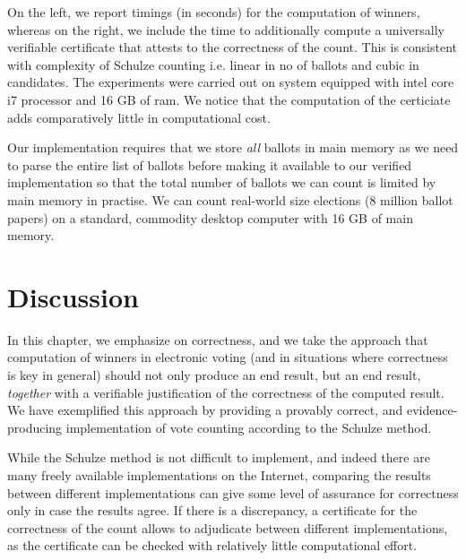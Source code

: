 
\noindent
On the left, we report timings (in seconds) for the computation of
winners, whereas on the right, we include the time to additionally
compute a universally verifiable certificate that attests  to the
correctness of the count. This is consistent with complexity of Schulze 
counting i.e. linear in no of ballots and cubic in candidates. 
The experiments were carried out on system 
equipped with intel core i7 processor and 16 GB of ram. We notice that the
computation of the certiciate adds comparatively little in
computational cost. 

Our implementation requires that we store \emph{all}
ballots in main memory as we need to parse the entire list of
ballots before making it available to our verified implementation so
that the total number of ballots we can count is limited by main
memory in practise. We can count real-world size elections (8
million ballot papers) on a standard, commodity desktop computer with
16 GB of main memory. 

  
\section{Discussion} \label{sec:discussion}

In this chapter,  we emphasize on correctness, 
and we take the approach that computation of winners in
electronic voting (and in situations where correctness is key in
general) should not only produce an end result, but an end result,
\emph{together} with a verifiable justification of the correctness
of the computed result. We have exemplified this
approach by providing a provably correct, and evidence-producing
implementation of vote counting according to the Schulze method. 

While the Schulze method is not difficult to implement, and indeed
there are many freely available implementations on the Internet, 
comparing the
results between different implementations can give some level of
assurance for correctness only in case the results agree.  If there
is a discrepancy, a certificate for the correctness of the count
allows to adjudicate between different implementations, as the
certificate can be checked with relatively little computational
effort. 

